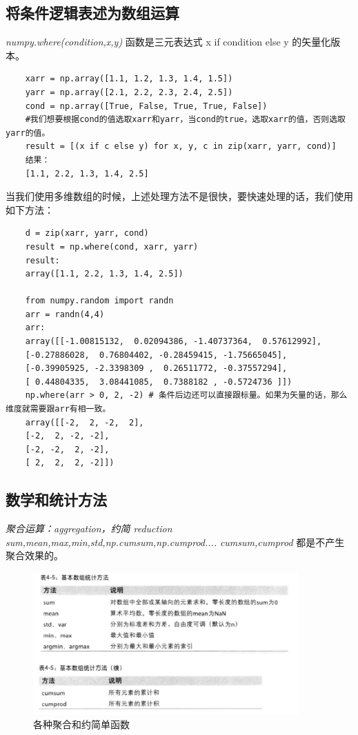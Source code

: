 \documentclass{article}
\begin{document}
\subsection{将条件逻辑表述为数组运算}
\emph{numpy.where(condition,x,y)} 函数是三元表达式 x if condition else y 的矢量化版本。

\begin{lstlisting}
	xarr = np.array([1.1, 1.2, 1.3, 1.4, 1.5])
	yarr = np.array([2.1, 2.2, 2.3, 2.4, 2.5])
	cond = np.array([True, False, True, True, False])
	#我们想要根据cond的值选取xarr和yarr，当cond的true，选取xarr的值，否则选取yarr的值。 
	result = [(x if c else y) for x, y, c in zip(xarr, yarr, cond)]
	结果：
	[1.1, 2.2, 1.3, 1.4, 2.5]
\end{lstlisting}
当我们使用多维数组的时候，上述处理方法不是很快，要快速处理的话，我们使用如下方法：
\begin{lstlisting}
	d = zip(xarr, yarr, cond)
	result = np.where(cond, xarr, yarr)
	result:
	array([1.1, 2.2, 1.3, 1.4, 2.5])
	
	from numpy.random import randn
	arr = randn(4,4)
	arr:
	array([[-1.00815132,  0.02094386, -1.40737364,  0.57612992],
	[-0.27886028,  0.76804402, -0.28459415, -1.75665045],
	[-0.39905925, -2.3398309 ,  0.26511772, -0.37557294],
	[ 0.44804335,  3.08441085,  0.7388182 , -0.5724736 ]])
	np.where(arr > 0, 2, -2) # 条件后边还可以直接跟标量。如果为矢量的话，那么维度就需要跟arr有相一致。
	array([[-2,  2, -2,  2],
	[-2,  2, -2, -2],
	[-2, -2,  2, -2],
	[ 2,  2,  2, -2]])
\end{lstlisting}

\subsection{数学和统计方法}
\emph{聚合运算：aggregation，约简 reduction
sum,mean,max,min,std,np.cumsum,np.cumprod....}
\emph{cumsum,cumprod} 都是不产生聚合效果的。

\begin{figure}[htbp]
	\centering
	\label{fig-juhehanshu}
	\includegraphics[width=4in]{fig/np_4}
	\caption{各种聚合和约简单函数}
\end{figure}
	
\end{document}
